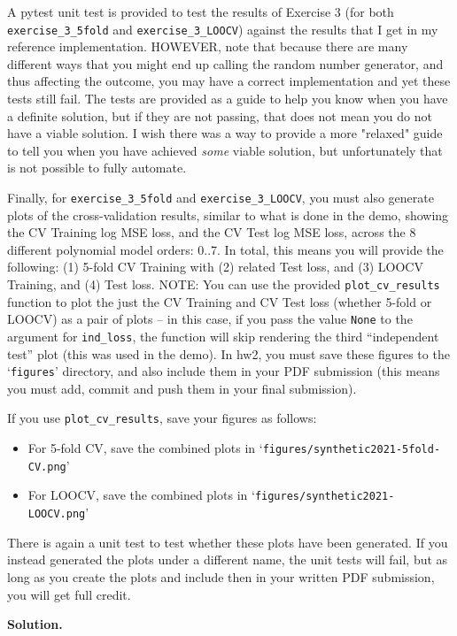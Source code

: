 \documentclass[10pt]{article}
\begin{document}
\begin{itemize}
A pytest unit test is provided to test the results of Exercise 3 (for both {\tt exercise\_3\_5fold} and {\tt exercise\_3\_LOOCV}) against the results that I get in my reference implementation. HOWEVER, note that because there are many different ways that you might end up calling the random number generator, and thus affecting the outcome, you may have a correct implementation and yet these tests still fail. The tests are provided as a guide to help you know when you have a definite solution, but if they are not passing, that does not mean you do not have a viable solution. I wish there was a way to provide a more "relaxed" guide to tell you when you have achieved {\em some} viable solution, but unfortunately that is not possible to fully automate.

Finally, for {\tt exercise\_3\_5fold} and {\tt exercise\_3\_LOOCV}, you must also generate plots of the cross-validation results, similar to what is done in the demo, showing the CV Training log MSE loss, and the CV Test log MSE loss, across the 8 different polynomial model orders: 0..7. In total,  this means you will provide the following: (1) 5-fold CV Training with (2) related Test loss, and (3) LOOCV Training, and (4) Test loss. NOTE: You can use the provided {\tt plot\_cv\_results} function to plot the just the CV Training and CV Test loss (whether 5-fold or LOOCV) as a pair of plots -- in this case, if you pass the value {\tt None} to the argument for {\tt ind\_loss}, the function will skip rendering the third ``independent test'' plot (this was used in the demo). In hw2, you must save these figures to the `{\tt figures}' directory, and also include them in your PDF submission (this means you must add, commit and push them in your final submission).

If you use {\tt plot\_cv\_results}, save your figures as follows:
\begin{itemize}
\item For 5-fold CV, save the combined plots in `{\tt figures/synthetic2021-5fold-CV.png}'
\item For LOOCV, save the combined plots in `{\tt figures/synthetic2021-LOOCV.png}'
\end{itemize}
There is again a unit test to test whether these plots have been generated. If you instead generated the plots under a different name, the unit tests will fail, but as long as you create the plots and include then in your written PDF submission, you will get full credit.

{\bf Solution.} 


\end{itemize}
\end{document}
